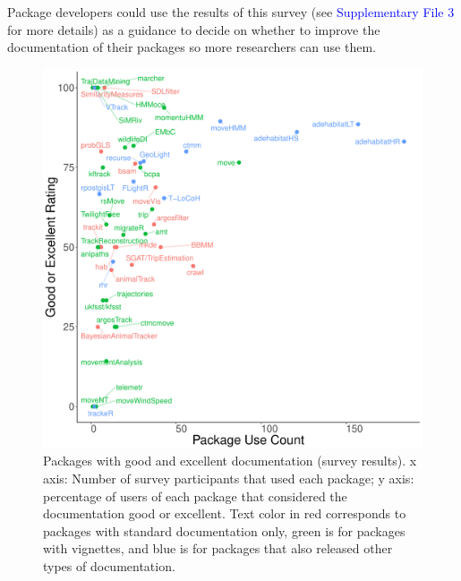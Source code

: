 \documentclass[a4paper,12pt]{article}
\begin{document}
Package developers could use the results of this survey (see \textcolor{blue}{Supplementary File 3} for more details) as a guidance to decide on whether to improve the documentation of their packages so more researchers can use them. 

\begin{figure}
	\centering
	\includegraphics[width=1\textwidth]{./mes_images/doc_vs_participants_noleg.pdf}
	\caption{\label{fig:DocParticipants} Packages with good and excellent documentation (survey results). x axis: Number of survey participants that used each package; y axis: percentage of users of each package that considered the documentation good or excellent. Text color in red corresponds to packages with standard documentation only, green is for packages with vignettes, and blue is for packages that also released other types of documentation.}
\end{figure}
\end{document}
